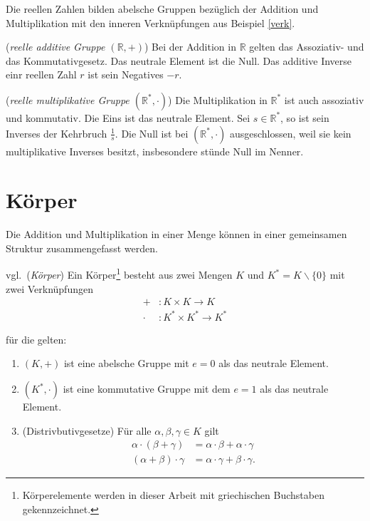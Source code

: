 \newpage
Die reellen Zahlen bilden abelsche Gruppen bezüglich der Addition und Multiplikation mit den inneren Verknüpfungen aus Beispiel \ref{verk}.

\begin{example}(\emph{reelle additive Gruppe $(\mathbb{R},+)$})
\label{rag}
Bei der Addition in $\mathbb{R}$ gelten das Assoziativ- und das Kommutativgesetz. Das neutrale Element ist die Null. Das additive Inverse einr reellen Zahl $r$ ist sein Negatives $-r$. 
\end{example}

\begin{example}(\emph{reelle multiplikative Gruppe $(\mathbb{R}^*,\cdot)$})
\label{rmg}
Die Multiplikation in $\mathbb{R}^*$ ist auch assoziativ und kommutativ. Die Eins ist das neutrale Element. Sei $s \in \mathbb{R}^*$, so ist sein Inverses der Kehrbruch $\frac{1}{s}$. Die Null ist bei $(\mathbb{R}^*,\cdot)$ ausgeschlossen, weil sie kein multiplikative Inverses besitzt, insbesondere stünde Null im Nenner.
\end{example}

\newpage
\section{Körper}
\label{sec:Körper}
Die Addition und Multiplikation in einer Menge können in einer gemeinsamen Struktur zusammengefasst werden.
\theoremstyle{defintion}
\begin{definition}vgl.\,\cite{Koerper} (\emph{Körper})
\label{Koerper}
Ein Körper\footnote{Körperelemente werden in dieser Arbeit mit griechischen Buchstaben gekennzeichnet.} besteht aus zwei Mengen $K$ und $K^*=K \backslash \{0\}$ mit zwei Verknüpfungen
\begin{align*}
	+&: K \times K \rightarrow K
	\\ \cdot &: K^* \times K^* \rightarrow K^*
\end{align*}

für die gelten:
\begin{enumerate}
\item $(K,+)$ ist eine abelsche Gruppe mit $e=0$ als das neutrale Element.
\item $(K^*,\cdot)$ ist eine kommutative Gruppe mit dem $e=1$ als das neutrale Element.
\item(Distrivbutivgesetze)
Für alle $\alpha, \beta, \gamma \in K$ gilt
\begin{align*}
\alpha \cdot (\beta+\gamma )  &= \alpha \cdot \beta + \alpha \cdot \gamma 
\\ (\alpha+\beta) \cdot \gamma  &= \alpha \cdot \gamma  + \beta \cdot \gamma\text{.}
\end{align*}
\end{enumerate}
\end{definition}


